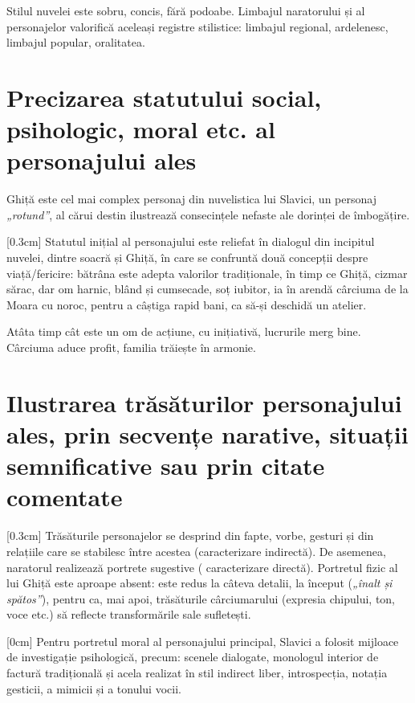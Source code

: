 \documentclass[
12pt,
a4paper
]{article}
\begin{document}
Stilul nuvelei este sobru, concis, fără podoabe. Limbajul naratorului și al personajelor valorifică aceleași registre stilistice: limbajul regional, ardelenesc, limbajul popular, oralitatea.

\section{Precizarea statutului social, psihologic, moral etc. al personajului ales}

Ghiță este cel mai complex personaj din nuvelistica lui Slavici, un personaj \textit{„rotund”}, al cărui destin ilustrează consecințele nefaste ale dorinței de îmbogățire.

[0.3cm]
Statutul inițial al personajului este reliefat în dialogul din incipitul nuvelei, dintre soacră și Ghiță, în care se confruntă două concepții despre viață/fericire: bătrâna este adepta valorilor tradiționale, în timp ce Ghiță, cizmar sărac, dar om harnic, blând și cumsecade, soț iubitor, ia în arendă cârciuma de la Moara cu noroc, pentru a câștiga rapid bani, ca să-și deschidă un atelier.

Atâta timp cât este un om de acțiune, cu inițiativă, lucrurile merg bine. Cârciuma aduce profit, familia trăiește în armonie.

\section{Ilustrarea trăsăturilor personajului ales, prin secvențe narative, situații semnificative sau prin citate comentate}

[0.3cm]
Trăsăturile personajelor se desprind din fapte, vorbe, gesturi și din relațiile care se stabilesc între acestea (caracterizare indirectă). De asemenea, naratorul realizează portrete sugestive ( caracterizare directă). Portretul fizic al lui Ghiță este aproape absent: este redus la câteva detalii, la început (\textit{„înalt și spătos”}), pentru ca, mai apoi, trăsăturile cârciumarului (expresia chipului, ton, voce etc.) să reflecte transformările sale sufletești.

[0cm]
Pentru portretul moral al personajului principal, Slavici a folosit mijloace de in\-ves\-ti\-ga\-ți\-e psihologică, precum: scenele dialogate, monologul interior de factură tradițională și acela realizat în stil indirect liber, introspecția, notația gesticii, a mimicii și a tonului vocii.
\end{document}
